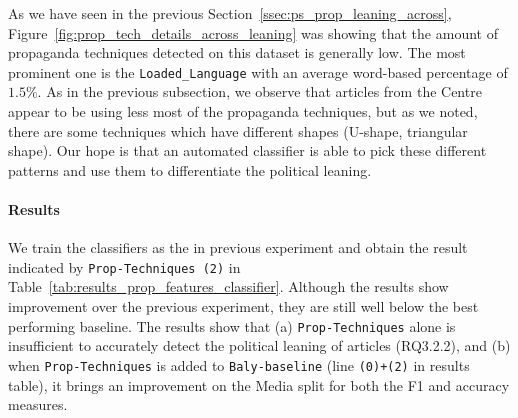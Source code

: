 As we have seen in the previous Section~\ref{ssec:ps_prop_leaning_across},  Figure~\ref{fig:prop_tech_details_across_leaning} was showing that the amount of propaganda techniques detected on this dataset is generally low. The most prominent one is the \texttt{Loaded\_Language} with an average word-based percentage of $1.5\%$.
As in the previous subsection, we observe that articles from the Centre appear to be using less most of the propaganda techniques, %
but as we noted, there are some techniques which have different shapes (U-shape, triangular shape). Our hope is that an automated classifier is able to pick these different patterns and use them to differentiate the political leaning. 




\paragraph{Results}

We train the classifiers as the in previous experiment and obtain the result indicated by \texttt{Prop-Techniques (2)} in Table~\ref{tab:results_prop_features_classifier}. Although the results show improvement over the previous experiment, they are still well below the best performing baseline. %
The results show that (a) \texttt{Prop-Techniques} alone is insufficient to accurately detect the political leaning of articles (RQ3.2.2), and (b) when \texttt{Prop-Techniques} is added to \texttt{Baly-baseline} (line \texttt{(0)+(2)} in results table), it brings an improvement on the Media split for both the F1 and accuracy measures. 



